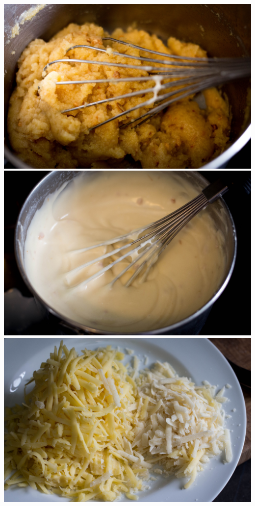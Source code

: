 \newpage
\includegraphics[width=\textwidth]{food/mac-n-cheese/images/hi-res/07.jpg}
\newpage
\includegraphics[width=\textwidth]{food/mac-n-cheese/images/hi-res/08.jpg}
\newpage
\includegraphics[width=\textwidth]{food/mac-n-cheese/images/hi-res/09.jpg}
